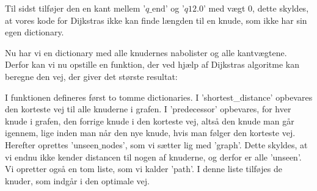 Til sidst tilføjer den en kant mellem '$q\textrm{\_end}$' og '$q12.0$' med vægt $0$, dette skyldes, at vores kode for Dijkstras ikke kan finde længden til en knude, som ikke har sin egen dictionary.

Nu har vi en dictionary med alle knudernes nabolister og alle kantvægtene. Derfor kan vi nu opstille en funktion, der ved hjælp af Dijkstras algoritme kan beregne den vej, der giver det største resultat:



I funktionen defineres først to tomme dictionaries. I 'shortest\_distance' opbevares den korteste vej til alle knuderne i grafen. I 'predecessor' opbevares, for hver knude i grafen, den forrige knude i den korteste vej, altså den knude man går igennem, lige inden man når den nye knude, hvis man følger den korteste vej. Herefter oprettes 'unseen$\_$nodes', som vi sætter lig med 'graph'. Dette skyldes, at vi endnu ikke kender distancen til nogen af knuderne, og derfor er alle 'unseen'. Vi opretter også en tom liste, som vi kalder 'path'. I denne liste tilføjes de knuder, som indgår i den optimale vej.

